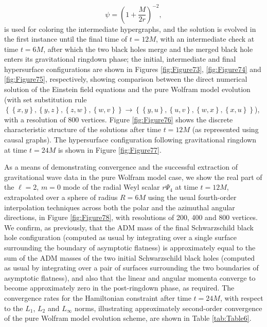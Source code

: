 \documentclass{article}
\begin{document}
\begin{equation}
\psi = \left( 1 + \frac{M}{2r} \right)^{-2},
\end{equation}
is used for coloring the intermediate hypergraphs, and the solution is evolved in the first instance until the final time of ${t = 12 M}$, with an intermediate check at time ${t = 6 M}$, after which the two black holes merge and the merged black hole enters its gravitational ringdown phase; the initial, intermediate and final hypersurface configurations are shown in Figures \ref{fig:Figure73}, \ref{fig:Figure74} and \ref{fig:Figure75}, respectively, showing comparison between the direct numerical solution of the Einstein field equations and the pure Wolfram model evolution (with set substitution rule ${\left\lbrace \left\lbrace x, y \right\rbrace, \left\lbrace y, z \right\rbrace, \left\lbrace z, w \right\rbrace, \left\lbrace w, v \right\rbrace \right\rbrace \to \left\lbrace \left\lbrace y, u \right\rbrace, \left\lbrace u, v \right\rbrace, \left\lbrace w, x \right\rbrace, \left\lbrace x, u \right\rbrace \right\rbrace}$), with a resolution of 800 vertices. Figure \ref{fig:Figure76} shows the discrete characteristic structure of the solutions after time ${t = 12 M}$ (as represented using causal graphs). The hypersurface configuration following gravitational ringdown at time ${t = 24 M}$ is shown in Figure \ref{fig:Figure77}.

As a means of demonstrating convergence and the successful extraction of gravitational wave data in the pure Wolfram model case, we show the real part of the ${\ell = 2}$, ${m = 0}$ mode of the radial Weyl scalar ${r \Psi_4}$ at time ${t = 12 M}$, extrapolated over a sphere of radius ${R = 6 M}$ using the usual fourth-order interpolation techniques across both the polar and the azimuthal angular directions, in Figure \ref{fig:Figure78}, with resolutions of 200, 400 and 800 vertices. We confirm, as previously, that the ADM mass of the final Schwarzschild black hole configuration (computed as usual by integrating over a single surface surrounding the boundary of asymptotic flatness) is approximately equal to the sum of the ADM masses of the two initial Schwarzschild black holes (computed as usual by integrating over a pair of surfaces surrounding the two boundaries of asymptotic flatness), and also that the linear and angular momenta converge to become approximately zero in the post-ringdown phase, as required. The convergence rates for the Hamiltonian constraint after time ${t = 24 M}$, with respect to the ${L_1}$, ${L_2}$ and ${L_{\infty}}$ norms, illustrating approximately second-order convergence of the pure Wolfram model evolution scheme, are shown in Table \ref{tab:Table6}.
\end{document}
